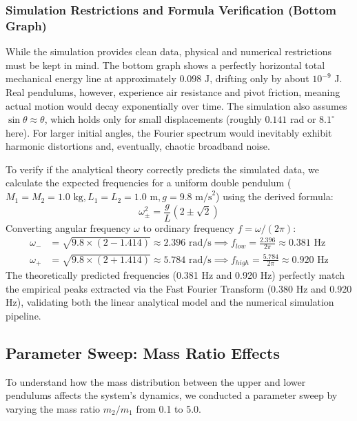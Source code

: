 \documentclass[12pt, a4paper, twoside]{article}
\begin{document}
\subsubsection{Simulation Restrictions and Formula Verification (Bottom Graph)}
While the simulation provides clean data, physical and numerical restrictions must be kept in mind. The bottom graph shows a perfectly horizontal total mechanical energy line at approximately $0.098\text{ J}$, drifting only by about $10^{-9}$ J. Real pendulums, however, experience air resistance and pivot friction, meaning actual motion would decay exponentially over time. The simulation also assumes $\sin\theta \approx \theta$, which holds only for small displacements (roughly $0.141$ rad or $8.1^\circ$ here). For larger initial angles, the Fourier spectrum would inevitably exhibit harmonic distortions and, eventually, chaotic broadband noise.

To verify if the analytical theory correctly predicts the simulated data, we calculate the expected frequencies for a uniform double pendulum ($M_1=M_2=1.0\text{ kg}, L_1=L_2=1.0\text{ m}, g=9.8\text{ m/s}^2$) using the derived formula:
\begin{equation}
\omega_{\pm}^2 = \frac{g}{L}(2 \pm \sqrt{2})
\end{equation}
Converting angular frequency $\omega$ to ordinary frequency $f = \omega/(2\pi)$:
\begin{align}
    \omega_- &= \sqrt{9.8 \times (2 - 1.414)} \approx 2.396 \text{ rad/s} \implies f_{low} = \frac{2.396}{2\pi} \approx 0.381 \text{ Hz} \\
    \omega_+ &= \sqrt{9.8 \times (2 + 1.414)} \approx 5.784 \text{ rad/s} \implies f_{high} = \frac{5.784}{2\pi} \approx 0.920 \text{ Hz}
\end{align}
The theoretically predicted frequencies (0.381 Hz and 0.920 Hz) perfectly match the empirical peaks extracted via the Fast Fourier Transform (0.380 Hz and 0.920 Hz), validating both the linear analytical model and the numerical simulation pipeline.

\clearpage

\subsection{Parameter Sweep: Mass Ratio Effects}
To understand how the mass distribution between the upper and lower pendulums affects the system's dynamics, we conducted a parameter sweep by varying the mass ratio $m_2/m_1$ from 0.1 to 5.0.
\end{document}
